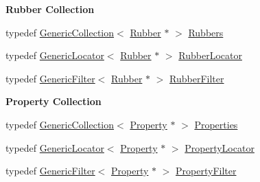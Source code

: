 \begin{Indent}\textbf{ Rubber Collection}\par
\begin{DoxyCompactItemize}
\item 
typedef \mbox{\hyperlink{classHurricane_1_1GenericCollection}{Generic\+Collection}}$<$ \mbox{\hyperlink{classHurricane_1_1Rubber}{Rubber}} $\ast$ $>$ \mbox{\hyperlink{namespaceHurricane_af8923abd57508cc44931a00d61b564ad}{Rubbers}}
\item 
typedef \mbox{\hyperlink{classHurricane_1_1GenericLocator}{Generic\+Locator}}$<$ \mbox{\hyperlink{classHurricane_1_1Rubber}{Rubber}} $\ast$ $>$ \mbox{\hyperlink{namespaceHurricane_ae4f27278e942109c3c47ad1b741f9df3}{Rubber\+Locator}}
\item 
typedef \mbox{\hyperlink{classHurricane_1_1GenericFilter}{Generic\+Filter}}$<$ \mbox{\hyperlink{classHurricane_1_1Rubber}{Rubber}} $\ast$ $>$ \mbox{\hyperlink{namespaceHurricane_ae331d428a7e324593e4a47dac023b7f0}{Rubber\+Filter}}
\end{DoxyCompactItemize}
\end{Indent}
\begin{Indent}\textbf{ Property Collection}\par
\begin{DoxyCompactItemize}
\item 
typedef \mbox{\hyperlink{classHurricane_1_1GenericCollection}{Generic\+Collection}}$<$ \mbox{\hyperlink{classHurricane_1_1Property}{Property}} $\ast$ $>$ \mbox{\hyperlink{namespaceHurricane_afd7bca6dad4be54b7c03b0463e6c0004}{Properties}}
\item 
typedef \mbox{\hyperlink{classHurricane_1_1GenericLocator}{Generic\+Locator}}$<$ \mbox{\hyperlink{classHurricane_1_1Property}{Property}} $\ast$ $>$ \mbox{\hyperlink{namespaceHurricane_a91d71616b5784225dfd4296487e49c07}{Property\+Locator}}
\item 
typedef \mbox{\hyperlink{classHurricane_1_1GenericFilter}{Generic\+Filter}}$<$ \mbox{\hyperlink{classHurricane_1_1Property}{Property}} $\ast$ $>$ \mbox{\hyperlink{namespaceHurricane_a9e98e66d188d506145a5e92045691777}{Property\+Filter}}
\end{DoxyCompactItemize}
\end{Indent}
